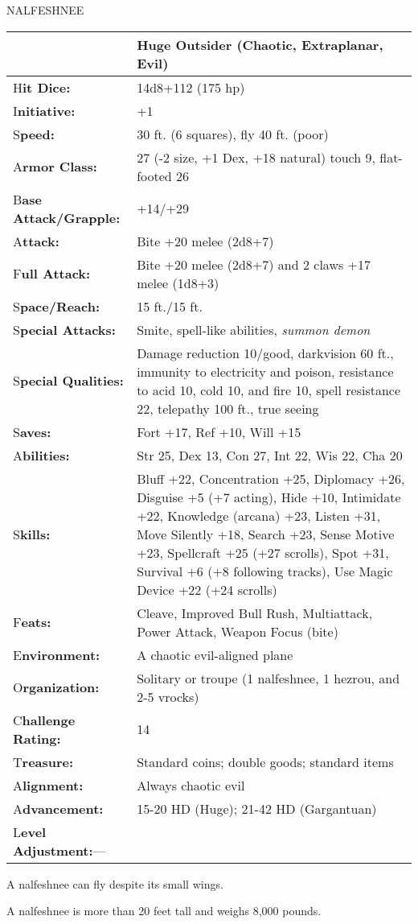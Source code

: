 \documentclass{article}
\begin{document}
\vspace{12pt}
NALFESHNEE

\begin{tabular}{|>{\raggedright}p{91pt}|>{\raggedright}p{224pt}|}
\hline
  & Huge Outsider (Chaotic, Extraplanar, Evil)\tabularnewline
\hline
H\textbf{it Dice:} & 14d8+112 (175 hp)\tabularnewline
\hline
I\textbf{nitiative:} & +1\tabularnewline
\hline
S\textbf{peed:} & 30 ft. (6 squares), fly 40 ft. (poor)\tabularnewline
\hline
A\textbf{rmor Class:} & 27 (-2 size, +1 Dex, +18 natural) touch 9, flat-footed 
26\tabularnewline
\hline
B\textbf{ase Attack/Grapple:} & +14/+29\tabularnewline
\hline
A\textbf{ttack:} & Bite +20 melee (2d8+7)\tabularnewline
\hline
F\textbf{ull Attack:} & Bite +20 melee (2d8+7) and 2 claws +17 melee (1d8+3)\tabularnewline
\hline
S\textbf{pace/Reach:} & 15 ft./15 ft.\tabularnewline
\hline
S\textbf{pecial Attacks:} & Smite, spell-like abilities, \textit{summon demon}\tabularnewline
\hline
S\textbf{pecial Qualities:} & Damage reduction 10/good, darkvision 60 ft., immunity 
to electricity and poison, resistance to acid 10, cold 10, and fire 10, spell resistance 
22, telepathy 100 ft., true seeing\tabularnewline
\hline
S\textbf{aves:} & Fort +17, Ref +10, Will +15\tabularnewline
\hline
A\textbf{bilities:} & Str 25, Dex 13, Con 27, Int 22, Wis 22, Cha 20\tabularnewline
\hline
S\textbf{kills:} & Bluff +22, Concentration +25, Diplomacy +26, Disguise +5 (+7 
acting), Hide +10, Intimidate +22, Knowledge (arcana) +23, Listen +31, Move Silently 
+18, Search +23, Sense Motive +23, Spellcraft +25 (+27 scrolls), Spot +31, Survival 
+6 (+8 following tracks), Use Magic Device +22 (+24 scrolls)\tabularnewline
\hline
F\textbf{eats:} & Cleave, Improved Bull Rush, Multiattack, Power Attack, Weapon 
Focus (bite)\tabularnewline
\hline
E\textbf{nvironment:} & A chaotic evil-aligned plane\tabularnewline
\hline
O\textbf{rganization:} & Solitary or troupe (1 nalfeshnee, 1 hezrou, and 2-5 vrocks)\tabularnewline
\hline
C\textbf{hallenge Rating:} & 14\tabularnewline
\hline
T\textbf{reasure:} & Standard coins; double goods; standard items\tabularnewline
\hline
A\textbf{lignment:} & Always chaotic evil\tabularnewline
\hline
A\textbf{dvancement:} & 15-20 HD (Huge); 21-42 HD (Gargantuan)\tabularnewline
\hline
L\textbf{evel Adjustment:}--- & \tabularnewline
\hline
\end{tabular}

A nalfeshnee can fly despite its small wings.

A nalfeshnee is more than 20 feet tall and weighs 8,000 pounds.
\end{document}
